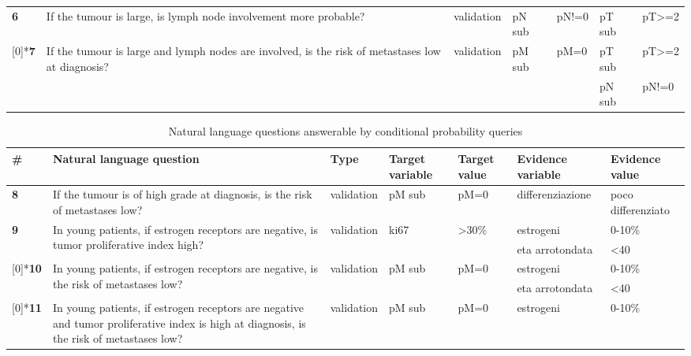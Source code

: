 \begin{sidewaystable*}[h]
\begin{tabularx}{\textwidth}{lXllllX}
		\addlinespace
		\textbf{6} & If the tumour is large, is lymph node involvement more probable? & validation & pN sub & pN!=0 & pT sub & pT>=2  \\  
		\addlinespace[2ex]
		\multirow{2}[0]{*}{\textbf{7}} & \multirow{2}[0]{4cm}{If the tumour is large and lymph nodes are involved, is the risk of metastases low at diagnosis?} & \multirow{2}[0]{*}{validation} & \multirow{2}[0]{*}{pM sub} & \multirow{2}[0]{*}{pM=0} & pT sub & pT>=2  \\ 
		&       &       &       &       & pN sub & pN!=0 \\  
\end{tabularx}
	\label{app:conditionalprobability1}
\end{sidewaystable*}

\begin{sidewaystable*}[h]
  \centering
  \caption{Natural language questions answerable by conditional probability queries}
    \begin{tabularx}{\textwidth}{lXllllX}
	    \toprule
	    \textbf{\#} & Natural language question & Type  & Target variable & Target value & Evidence variable & Evidence value \\
		\midrule      
		\textbf{8} & If the tumour is of high grade at diagnosis, is the risk of metastases low? & validation & pM sub & pM=0  & differenziazione & poco differenziato \\
		\multirow{2}[0]{*}{\textbf{9}} & \multirow{2}[0]{4cm}{In young patients, if estrogen receptors are negative, is tumor proliferative index high?} & \multirow{2}[0]{*}{validation} & \multirow{2}[0]{*}{ki67} & \multirow{2}[0]{*}{>30\%} & estrogeni & 0-10\% \\
		      &       &       &       &       & eta arrotondata & <40 \\	  
	    \addlinespace[6ex]
		\multirow{2}[0]{*}{\textbf{10}} & \multirow{2}[0]{4cm}{In young patients, if estrogen receptors are negative, is the risk of metastases low?} & \multirow{2}[0]{*}{validation} & \multirow{2}[0]{*}{pM sub} & \multirow{2}[0]{4cm}{pM=0} & estrogeni & 0-10\% \\
		      &       &       &       &       & eta arrotondata & <40 \\
      \addlinespace[6ex]
		\multirow{3}[0]{*}{\textbf{11}} & \multirow{3}[0]{4cm}{In young patients, if estrogen receptors are negative and tumor proliferative index is  high at diagnosis, is the risk of metastases low?} & \multirow{3}[0]{*}{validation} & \multirow{3}[0]{*}{pM sub} & \multirow{3}[0]{*}{pM=0} & estrogeni & 0-10\% \\

\end{tabularx}
\end{sidewaystable*}
